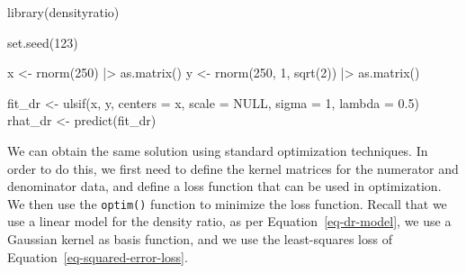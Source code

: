 \documentclass[
]{article}
\newenvironment{Shaded}{\begin{snugshade}}{\end{snugshade}}
\newcommand{\AttributeTok}[1]{\textcolor[rgb]{0.40,0.45,0.13}{#1}}
\newcommand{\ConstantTok}[1]{\textcolor[rgb]{0.56,0.35,0.01}{#1}}
\newcommand{\DecValTok}[1]{\textcolor[rgb]{0.68,0.00,0.00}{#1}}
\newcommand{\FloatTok}[1]{\textcolor[rgb]{0.68,0.00,0.00}{#1}}
\newcommand{\FunctionTok}[1]{\textcolor[rgb]{0.28,0.35,0.67}{#1}}
\newcommand{\NormalTok}[1]{\textcolor[rgb]{0.00,0.23,0.31}{#1}}
\newcommand{\OtherTok}[1]{\textcolor[rgb]{0.00,0.23,0.31}{#1}}
\newcommand{\SpecialCharTok}[1]{\textcolor[rgb]{0.37,0.37,0.37}{#1}}
\begin{document}
\linespread{1}

\begin{Shaded}
\begin{Highlighting}[]
\FunctionTok{library}\NormalTok{(densityratio)}

\FunctionTok{set.seed}\NormalTok{(}\DecValTok{123}\NormalTok{)}

\NormalTok{x }\OtherTok{\textless{}{-}} \FunctionTok{rnorm}\NormalTok{(}\DecValTok{250}\NormalTok{) }\SpecialCharTok{|\textgreater{}} \FunctionTok{as.matrix}\NormalTok{()}
\NormalTok{y }\OtherTok{\textless{}{-}} \FunctionTok{rnorm}\NormalTok{(}\DecValTok{250}\NormalTok{, }\DecValTok{1}\NormalTok{, }\FunctionTok{sqrt}\NormalTok{(}\DecValTok{2}\NormalTok{)) }\SpecialCharTok{|\textgreater{}} \FunctionTok{as.matrix}\NormalTok{()}

\NormalTok{fit\_dr }\OtherTok{\textless{}{-}} \FunctionTok{ulsif}\NormalTok{(x, y, }\AttributeTok{centers =}\NormalTok{ x, }\AttributeTok{scale =} \ConstantTok{NULL}\NormalTok{, }\AttributeTok{sigma =} \DecValTok{1}\NormalTok{, }\AttributeTok{lambda =} \FloatTok{0.5}\NormalTok{)}
\NormalTok{rhat\_dr }\OtherTok{\textless{}{-}} \FunctionTok{predict}\NormalTok{(fit\_dr)}
\end{Highlighting}
\end{Shaded}

\linespread{2}

We can obtain the same solution using standard optimization techniques.
In order to do this, we first need to define the kernel matrices for the
numerator and denominator data, and define a loss function that can be
used in optimization. We then use the \texttt{optim()} function to
minimize the loss function. Recall that we use a linear model for the
density ratio, as per Equation~\ref{eq-dr-model}, we use a Gaussian
kernel as basis function, and we use the least-squares loss of
Equation~\ref{eq-squared-error-loss}.

\linespread{1}
\end{document}
